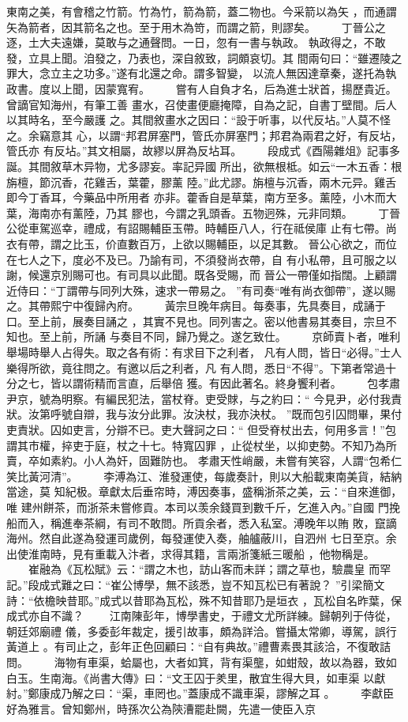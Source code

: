 \documentclass{ctexart}
\begin{document}
東南之美，有會稽之竹箭。竹為竹，箭為箭，蓋二物也。今采箭以為矢 ，而通謂矢為箭者，因其箭名之也。至于用木為笴，而謂之箭，則謬矣。 　　丁晉公之逐，土大夫遠嫌，莫敢与之通聲問。一日，忽有一書与執政。 執政得之，不敢發，立具上聞。洎發之，乃表也，深自敘致，詞頗哀切。其 間兩句曰：``雖遷陵之罪大，念立主之功多。''遂有北還之命。謂多智變， 以流人無因達章秦，遂托為執政書。度以上聞，因蒙寬宥。 　　嘗有人自負才名，后為進士狀首，揚歷貴近。曾謫官知海州，有筆工善 畫水，召使畫便廳掩障，自為之記，自書丁壁間。后人以其時名，至今嚴護 之。其間敘畫水之因曰：``設于听事，以代反坫。''人莫不怪之。余竊意其 心，以謂``邦君屏塞門，管氏亦屏塞門；邦君為兩君之好，有反坫，管氏亦 有反坫。''其文相屬，故繆以屏為反坫耳。 　　段成式《酉陽雜俎》記事多誕。其間敘草木异物，尤多謬妄。率記异國 所出，欲無根柢。如云``一木五香：根旃檀，節沉香，花雞舌，葉藿，膠薰 陸。''此尤謬。旃檀与沉香，兩木元异。雞舌即今丁香耳，今藥品中所用者 亦非。藿香自是草葉，南方至多。薰陸，小木而大葉，海南亦有薰陸，乃其 膠也，今謂之乳頭香。五物迥殊，元非同類。 　　丁晉公從車駕巡幸，禮成，有詔賜輔臣玉帶。時輔臣八人，行在祗侯庫 止有七帶。尚衣有帶，謂之比玉，价直數百万，上欲以賜輔臣，以足其數。 晉公心欲之，而位在七人之下，度必不及已。乃諭有司，不須發尚衣帶，自 有小私帶，且可服之以謝，候還京別賜可也。有司具以此聞。既各受賜，而 晉公一帶僅如指闊。上顧謂近侍曰：``丁謂帶与同列大殊，速求一帶易之。 ''有司奏``唯有尚衣御帶''，遂以賜之。其帶熙宁中復歸內府。 　　黃宗旦晚年病目。每奏事，先具奏目，成誦于口。至上前，展奏目誦之 ，其實不見也。同列害之。密以他書易其奏目，宗旦不知也。至上前，所誦 与奏目不同，歸乃覺之。遂乞致仕。 　　京師賣卜者，唯利舉場時舉人占得失。取之各有術：有求目下之利者， 凡有人問，皆日``必得。''士人樂得所欲，竟往問之。有邀以后之利者，凡 有人問，悉日``不得''。下第者常過十分之七，皆以謂術精而言直，后舉倍 獲。有因此著名。終身饗利者。 　　包孝肅尹京，號為明察。有編民犯法，當杖脊。吏受賕，与之約曰：`` 今見尹，必付我責狀。汝第呼號自辯，我与汝分此罪。汝決杖，我亦決杖。 ''既而包引囚問畢，果付吏責狀。囚如吏言，分辯不已。吏大聲訶之曰：`` 但受脊杖出去，何用多言！''包謂其市權，捽吏于庭，杖之十七。特寬囚罪 ，止從杖坐，以抑吏勢。不知乃為所賣，卒如素約。小人為奸，固難防也。 孝肅天性峭嚴，未嘗有笑容，人謂``包希仁笑比黃河清''。 　　李溥為江、淮發運使，每歲奏計，則以大船載東南美貨，結納當途，莫 知紀极。章獻太后垂帘時，溥因奏事，盛稱浙茶之美，云：``自來進御，唯 建州餅茶，而浙茶未嘗修貢。本司以羡余錢買到數千斤，乞進入內。''自國 門挽船而入，稱進奉茶綱，有司不敢問。所貢余者，悉入私室。溥晚年以賄 敗，竄謫海州。然自此遂為發運司歲例，每發運使入奏，舳艫蔽川，自泗州 七日至京。余出使淮南時，見有重載入汴者，求得其籍，言兩浙箋紙三暖船 ，他物稱是。 　　崔融為《瓦松賦》云：``謂之木也，訪山客而未詳；謂之草也，驗農皇 而罕記。''段成式難之曰：``崔公博學，無不該悉，豈不知瓦松已有著說？ ''引梁簡文詩：``依檐映昔耶。''成式以昔耶為瓦松，殊不知昔耶乃是垣衣 ，瓦松自名昨葉，保成式亦自不識？ 　　江南陳彭年，博學書史，于禮文尤所詳練。歸朝列于侍從，朝廷郊廟禮 儀，多委彭年裁定，援引故事，頗為詳洽。嘗攝太常卿，導駕，誤行黃道上 。有司止之，彭年正色回顧曰：``自有典故。''禮曹素畏其該洽，不復敢詰 問。 　　海物有車渠，蛤屬也，大者如箕，背有渠壟，如蚶殼，故以為器，致如 白玉。生南海。《尚書大傳》曰：``文王囚于羑里，散宜生得大貝，如車渠 以獻紂。''鄭康成乃解之曰：``渠，車罔也。''蓋康成不識車渠，謬解之耳 。 　　李獻臣好為雅言。曾知鄭州，時孫次公為陝漕罷赴闕，先遣一使臣入京 
\end{document}
